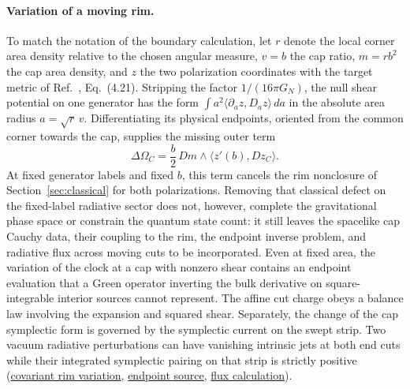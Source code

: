 \documentclass[10pt,a4paper]{article}
\numberwithin{equation}{section}
\newcommand{\repo}[2]{\href{https://github.com/sprajs/quantum-gravity/blob/main/#1}{#2}}
\begin{document}
\paragraph{Variation of a moving rim.}
To match the notation of the boundary calculation, let $r$ denote the local corner area density relative to the chosen angular measure, $v=b$ the cap ratio, $m=rb^2$ the cap area density, and $z$ the two polarization coordinates with the target metric of Ref.~\cite{Chandrasekaran2026}, Eq.~(4.21). Stripping the factor $1/(16\pi G_N)$, the null shear potential on one generator has the form $\int a^2\langle\partial_a z,D_a z\rangle\,da$ in the absolute area radius $a=\sqrt r\,v$. Differentiating its physical endpoints, oriented from the common corner towards the cap, supplies the missing outer term
\begin{equation}
 \Delta\Omega_C=\frac b2\,Dm\wedge\langle z'(b),Dz_C\rangle .
\end{equation}
At fixed generator labels and fixed $b$, this term cancels the rim nonclosure of Section~\ref{sec:classical} for both polarizations. Removing that classical defect on the fixed-label radiative sector does not, however, complete the gravitational phase space or constrain the quantum state count: it still leaves the spacelike cap Cauchy data, their coupling to the rim, the endpoint inverse problem, and radiative flux across moving cuts to be incorporated. Even at fixed area, the variation of the clock at a cap with nonzero shear contains an endpoint evaluation that a Green operator inverting the bulk derivative on square-integrable interior sources cannot represent. The affine cut charge obeys a balance law involving the expansion and squared shear. Separately, the change of the cap symplectic form is governed by the symplectic current on the swept strip. Two vacuum radiative perturbations can have vanishing intrinsic jets at both end cuts while their integrated symplectic pairing on that strip is strictly positive (\repo{audit/rim-potential.md}{covariant rim variation}, \repo{audit/endpoint-inverse.md}{endpoint source}, \repo{audit/radiative-flux.md}{flux calculation}).
\end{document}
